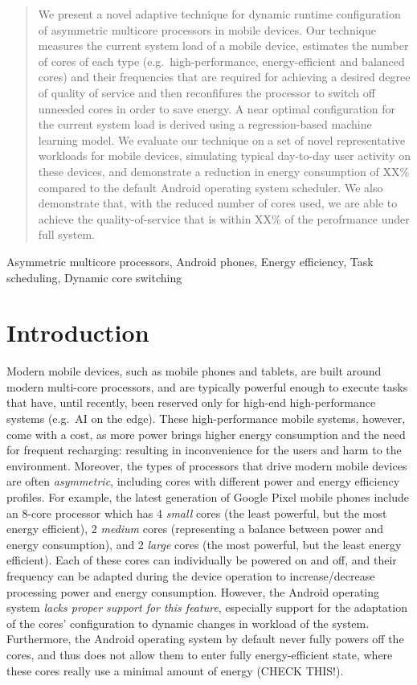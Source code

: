 \documentclass[conference]{IEEEtran}
\begin{document}
\begin{abstract}
We present a novel adaptive technique for dynamic runtime configuration of asymmetric multicore processors in mobile devices. Our technique measures the current system load of a mobile device, estimates the number of cores of each type (e.g.~high-performance, energy-efficient and balanced cores) and their frequencies that are required for achieving a desired degree of quality of service and then reconfifures the processor to switch off unneeded cores in order to save energy. A near optimal configuration for the current system load is derived using a regression-based machine learning model. We evaluate our technique on a set of novel representative workloads for mobile devices, simulating typical day-to-day user activity on these devices, and demonstrate a reduction in energy consumption of XX\% compared to the default Android operating system scheduler. We also demonstrate that, with the reduced number of cores used,  we are able to achieve the quality-of-service that is within XX\% of the perofrmance under full system.
\end{abstract}

\begin{IEEEkeywords}
Asymmetric multicore processors, Android phones, Energy efficiency, Task scheduling, Dynamic core switching
\end{IEEEkeywords}

\section{Introduction}
Modern mobile devices, such as mobile phones and tablets, are built around modern multi-core processors, and are typically powerful enough to execute tasks that have, until recently, been reserved only for high-end high-performance systems (e.g.~AI on the edge). These high-performance mobile systems, however, come with a cost, as more power brings higher energy consumption and the need for frequent recharging: resulting in inconvenience for the users and harm to the environment. Moreover, the types of processors that drive modern mobile devices are often \emph{asymmetric}, including cores with different power and energy efficiency profiles. For example, the latest generation of Google Pixel mobile phones include an 8-core processor which has 4 \emph{small} cores (the least powerful, but the most energy efficient), 2 \emph{medium} cores (representing a balance between power and energy consumption), and 2 \emph{large} cores (the most powerful, but the least energy efficient). Each of these cores can individually be powered on and off, and their frequency can be adapted during the device operation to increase/decrease processing power and energy consumption. However, the Android operating system \emph{lacks proper support for this feature}, especially support for the adaptation of the cores' configuration to dynamic changes in workload of the system. Furthermore, the Android operating system by default never fully powers off the cores, and thus does not allow them to enter fully energy-efficient state, where these cores really use a minimal amount of energy (CHECK THIS!).
\end{document}
